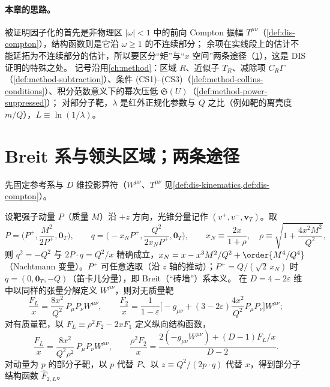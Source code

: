 \paragraph{本章的思路。}
被证明因子化的首先是非物理区 $|\omega|<1$ 中的前向 Compton 振幅 $T^{\mu\nu}$（\cref{def:dis-compton}），结构函数则是它沿 $\omega\ge1$ 的不连续部分；
余项在实线段上的估计不能延拓为不连续部分的估计，所以要区分“矩”与“$x$ 空间”两条途径（\cref{sec:disall-regions}），这是 DIS 证明的特殊之处。
记号沿用\cref{ch:method}：区域 $R$、近似子 $T_R$、减除项 $C_R\Gamma$（\cref{def:method-subtraction}）、条件 (CS1)–(CS3)（\cref{def:method-collins-conditions}）、积分范数意义下的幂次压低 $\mathfrak S(U)$（\cref{def:method-power-suppressed}）；
对部分子靶，$\lambda$ 是红外正规化参数与 $Q$ 之比（例如靶的离壳度 $m/Q$），$L\equiv\ln(1/\lambda)$。
\section{Breit 系与领头区域；两条途径}\label{sec:disall-regions}

先固定参考系与 $D$ 维投影算符（$W^{\mu\nu}$、$T^{\mu\nu}$ 见\cref{def:dis-kinematics,def:dis-compton}）。

\begin{definition}\label{def:disall-breit}
设靶强子动量 $P$（质量 $M$）沿 $+z$ 方向，光锥分量记作 $(v^+,v^-,\mathbf v_T)$。取
\begin{equation}\label{eq:disall-breit}
P=\Big(P^+,\frac{M^2}{2P^+},\mathbf 0_T\Big),\qquad q=\Big(-x_NP^+,\frac{Q^2}{2x_NP^+},\mathbf 0_T\Big),\qquad x_N\equiv\frac{2x}{1+\rho},\quad \rho\equiv\sqrt{1+\frac{4x^2M^2}{Q^2}},
\end{equation}
则 $q^2=-Q^2$ 与 $2P\cdot q=Q^2/x$ 精确成立，$x_N=x-x^3M^2/Q^2+\order{M^4/Q^4}$（Nachtmann 变量）。$P^+$ 可任意选取（沿 $z$ 轴的推动）；$P^+=Q/(\sqrt2\,x_N)$ 时 $q=(0,\mathbf 0_T,-Q)$（笛卡儿分量），即 Breit（“砖墙”）系本义。
在 $D=4-2\varepsilon$ 维中以同样的张量分解定义 $W^{\mu\nu}$，则对无质量靶
\begin{equation}\label{eq:disall-proj}
\frac{F_L}{x}=\frac{8x^2}{Q^2}\,P_\mu P_\nu W^{\mu\nu},\qquad
\frac{F_2}{x}=\frac1{1-\varepsilon}\Big[-g_{\mu\nu}+(3-2\varepsilon)\frac{4x^2}{Q^2}P_\mu P_\nu\Big]W^{\mu\nu};   %
\end{equation}
对有质量靶，以 $F_L\equiv\rho^2F_2-2xF_1$ 定义纵向结构函数，
\begin{equation}\label{eq:disall-proj-massive}
\frac{F_L}{x}=\frac{8x^2}{Q^2\rho^2}\,P_\mu P_\nu W^{\mu\nu},\qquad
\frac{\rho^2F_2}{x}=\frac{2(-g_{\mu\nu}W^{\mu\nu})+(D-1)F_L/x}{D-2}.   %
\end{equation}
对动量为 $p$ 的部分子靶，以 $p$ 代替 $P$、以 $z\equiv Q^2/(2p\cdot q)$ 代替 $x$，得到部分子结构函数 $\hat F_{2,L}$。
\end{definition}

